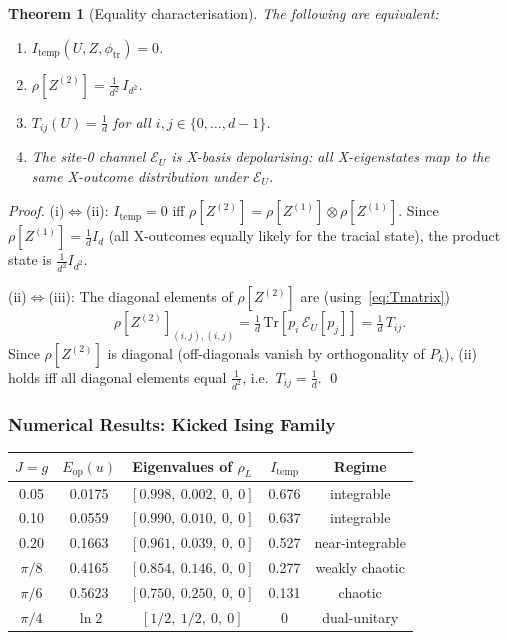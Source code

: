 \documentclass[12pt,a4paper]{article}
\newtheorem{theorem}{Theorem}[section]
\begin{document}
\begin{theorem}[Equality characterisation]\label{thm:equality_Tmatrix}
The following are equivalent:
\begin{enumerate}
\item[(i)] $I_\mathrm{temp}(U,Z,\phi_\mathrm{tr})=0$.
\item[(ii)] $\rho[Z^{(2)}] = \tfrac{1}{d^2}\,I_{d^2}$.
\item[(iii)] $T_{ij}(U)=\tfrac{1}{d}$ for all $i,j\in\{0,\ldots,d-1\}$.
\item[(iv)] The site-0 channel $\mathcal{E}_U$ is \emph{X-basis depolarising}:
  all X-eigenstates map to the same X-outcome distribution under $\mathcal{E}_U$.
\end{enumerate}
\end{theorem}
\begin{proof}
(i)$\Leftrightarrow$(ii): $I_\mathrm{temp}=0$ iff $\rho[Z^{(2)}]=\rho[Z^{(1)}]\otimes\rho[Z^{(1)}]$.
Since $\rho[Z^{(1)}]=\frac{1}{d}I_d$ (all X-outcomes equally likely for the tracial state),
the product state is $\frac{1}{d^2}I_{d^2}$.

(ii)$\Leftrightarrow$(iii): The diagonal elements of $\rho[Z^{(2)}]$ are
(using~\eqref{eq:Tmatrix})
\begin{equation}
  \rho[Z^{(2)}]_{(i,j),(i,j)}
  = \tfrac{1}{d}\,\mathrm{Tr}[p_i\,\mathcal{E}_U[p_j]]
  = \tfrac{1}{d}\,T_{ij}.
\end{equation}
Since $\rho[Z^{(2)}]$ is diagonal (off-diagonals vanish by orthogonality of $P_k$),
(ii) holds iff all diagonal elements equal $\frac{1}{d^2}$, i.e.\ $T_{ij}=\frac{1}{d}$. \qed
\end{proof}

\subsubsection{Numerical Results: Kicked Ising Family}

\begin{center}
\begin{tabular}{@{}ccccc@{}}
\toprule
$J=g$ & $E_\mathrm{op}(u)$ & Eigenvalues of $\rho_L$ & $I_\mathrm{temp}$ & Regime \\
\midrule
0.05 & 0.0175 & $[0.998,\ 0.002,\ 0,\ 0]$ & 0.676 & integrable \\
0.10 & 0.0559 & $[0.990,\ 0.010,\ 0,\ 0]$ & 0.637 & integrable \\
0.20 & 0.1663 & $[0.961,\ 0.039,\ 0,\ 0]$ & 0.527 & near-integrable \\
$\pi/8$ & 0.4165 & $[0.854,\ 0.146,\ 0,\ 0]$ & 0.277 & weakly chaotic \\
$\pi/6$ & 0.5623 & $[0.750,\ 0.250,\ 0,\ 0]$ & 0.131 & chaotic \\
$\pi/4$ & $\ln 2$ & $[1/2,\ 1/2,\ 0,\ 0]$ & $0$ & dual-unitary \\
\bottomrule
\end{tabular}
\end{center}
\end{document}
